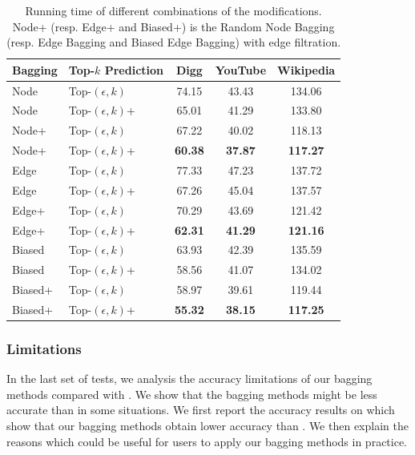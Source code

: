 \begin{table}
\caption{Running time of different combinations of the modifications. Node+
(resp. Edge+ and Biased+) is the Random Node Bagging (resp. Edge Bagging
and Biased Edge Bagging) with edge filtration.}
\label{tab_improvements}
\vspace{-2ex}
\centering
\newcommand{\tabincell}[2]{\begin{tabular}{@{}#1@{}}#2\end{tabular}}
\begin{tabular}{l|l|c|c|c}
\hline \hline Bagging & Top-$k$ Prediction & Digg & YouTube & Wikipedia  \\
\hline \hline
Node & Top-$(\epsilon, k)$           & 74.15    & 43.43 & 134.06  \\
Node & Top-$(\epsilon, k)$+        & 65.01    & 41.29 & 133.80 \\
Node+ & Top-$(\epsilon, k)$        & 67.22    & 40.02 & 118.13  \\
Node+ & Top-$(\epsilon, k)$+    & \textbf{60.38}   & \textbf{37.87} & \textbf{117.27} \\
\hline
Edge & Top-$(\epsilon, k)$            & 77.33   & 47.23 & 137.72  \\
Edge & Top-$(\epsilon, k)$+        & 67.26    & 45.04 & 137.57  \\
Edge+ & Top-$(\epsilon, k)$        & 70.29   & 43.69 & 121.42 \\
Edge+ & Top-$(\epsilon, k)$+    & \textbf{62.31}    & \textbf{41.29} & \textbf{121.16} \\
\hline
Biased & Top-$(\epsilon, k)$         & 63.93    & 42.39 & 135.59  \\
Biased & Top-$(\epsilon, k)$+      & 58.56    & 41.07 & 134.02  \\
Biased+ & Top-$(\epsilon, k)$      & 58.97    & 39.61 & 119.44  \\
Biased+ & Top-$(\epsilon, k)$+  & \textbf{55.32}    & \textbf{38.15} & \textbf{117.25}  \\
\hline \hline
\end{tabular}
\end{table}



\subsubsection{Limitations}
In the last set of tests, we analysis the accuracy limitations of our bagging methods
compared with \NMF. We show that the bagging methods might be less accurate
than \NMF in some situations. We first report the accuracy results on \Flickr
which show that our bagging methods obtain lower accuracy than \NMF.
We then explain the reasons which could be useful
for users to apply our bagging methods in practice.

